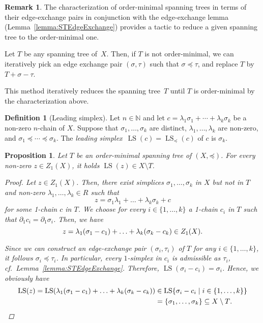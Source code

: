 \documentclass[oneside]{amsart}
\newtheorem{proposition}[theorem]{Proposition}
\theoremstyle{definition}
\newtheorem{definition}[theorem]{Definition}
\newtheorem{remark}[theorem]{Remark}
\DeclareMathOperator\LS{LS}
\begin{document}
\begin{remark}
    The characterization of order-minimal spanning trees in terms of their edge-exchange pairs in conjunction with the edge-exchange lemma (Lemma~\ref{lemma:STEdgeExchange}) provides a tactic to reduce a given spanning tree to the order-minimal one.
    
    Let $T$ be any spanning tree of~$X$.
    Then, if $T$ is not order-minimal, we can iteratively pick an edge exchange pair $(\sigma, \tau)$ such that $\sigma \preceq \tau$, and replace $T$ by $T + \sigma - \tau$.
    
    This method iteratively reduces the spanning tree~$T$ until $T$ is order-minimal by the characterization above.
\end{remark}

\begin{definition}[Leading simplex]
    Let $n \in \mathbb N$ and let $c = \lambda_1 \sigma_1 + \dotsb + \lambda_k \sigma_k$ be a non-zero $n$-chain of $X$.
    Suppose that $\sigma_1, \dotsc, \sigma_k$ are distinct, $\lambda_1, \dotsc, \lambda_k$ are non-zero, and $\sigma_1 \preceq \dotsb \preceq \sigma_k$.
    The \emph{leading simplex}~$\LS(c) = \LS_{\mathord\preceq}(c)$ of $c$ is $\sigma_k$.
\end{definition}

\begin{proposition}
    \label{proposition:LeadingSimplexComplement}
    Let $T$ be an order-minimal spanning tree of $(X, \mathord\preceq)$.
    For every non-zero $z \in Z_1(X)$, it holds $\LS(z) \in X \setminus T$.

    \begin{proof}
        Let $z \in Z_1(X)$.
        Then, there exist simplices $\sigma_1, \dotsc, \sigma_k$ in $X$ but not in $T$ and non-zero $\lambda_1, \dotsc, \lambda_k \in R$ such that
        \[ z = \sigma_1 \lambda_1 + \dotsc + \lambda_k \sigma_k + c \]
        for some 1-chain $c$ in $T$.
        We choose for every $i \in \{ 1, \dotsc, k \}$ a 1-chain $c_i$ in $T$ such that $\partial_1 c_i = \partial_1 \sigma_i$.
        Then, we have
        \[ z = \lambda_1 (\sigma_1 - c_1) + \dotsc + \lambda_k (\sigma_k - c_k) \in Z_1(X) \text. \]
    
        Since we can construct an edge-exchange pair $(\sigma_i, \tau_i)$ of $T$ for any $i \in \{ 1, \dotsc, k \}$, it follows $\sigma_i \preceq \tau_i$.
        In particular, every $1$-simplex in $c_i$ is admissible as $\tau_i$, cf.\ Lemma~\ref{lemma:STEdgeExchange}.
        Therefore, $\LS(\sigma_i - c_i) = \sigma_i$.
        Hence, we obviously have
        \begin{align*}
            \LS(z) = \LS(\lambda_1 (\sigma_1 - c_1) + \dotsc + \lambda_k (\sigma_k - c_k)) &\in \LS \{ \sigma_i - c_i \mid i \in \{ 1, \dotsc, k \} \} \\
            &= \{ \sigma_1, \dotsc, \sigma_k \} \subseteq X \setminus T \text.
            \qedhere
        \end{align*}
    \end{proof}    
\end{proposition}
\end{document}
